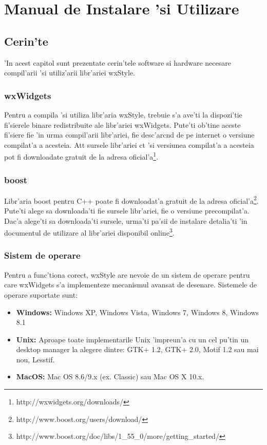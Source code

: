 \chapter{Manual de Instalare 'si Utilizare}
\pagestyle{headings}

\section{Cerin'te}

'In acest capitol sunt prezentate cerin'tele software si hardware necesare compil'arii 'si utiliz'arii libr'ariei wxStyle.

\subsection{wxWidgets}

Pentru a compila 'si utiliza libr'aria wxStyle, trebuie s'a ave'ti la dispozi'tie fi'sierele binare redistribuite ale libr'ariei wxWidgets. Pute'ti ob'tine aceste fi'siere fie 'in urma compil'arii libr'ariei, fie desc'arc{\ia}nd de pe internet o versiune compilat'a a acesteia. At{\ia}t sursele libr'ariei c{\ia}t 'si versiunea compilat'a a acesteia pot fi downloadate gratuit de la adresa oficial'a\footnote{http://wxwidgets.org/downloads/}.

\subsection{boost}

Libr'aria boost pentru C++ poate fi downloadat'a gratuit de la adresa oficial'a\footnote{http://www.boost.org/users/download/}. Pute'ti alege sa downloada'ti fie sursele libr'ariei, fie o versiune precompilat'a. Dac'a alege'ti sa downloada'ti sursele, urma'ti pa'sii de instalare detalia'ti 'in documentul de utilizare al libr'ariei disponibil online\footnote{http://www.boost.org/doc/libs/1\_55\_0/more/getting\_started/}.

\subsection{Sistem de operare}

Pentru a func'tiona corect, wxStyle are nevoie de un sistem de operare pentru care wxWidgets s'a implementeze mecanismul avansat de desenare. Sistemele de operare suportate sunt: 
\begin{itemize}
\item \textbf{Windows:} Windows XP, Windows Vista, Windows 7, Windows 8, Windows 8.1 
\item \textbf{Unix:} Aproape toate implementarile Unix 'impreun'a cu un cel pu'tin un desktop manager la alegere dintre: GTK+ 1.2, GTK+ 2.0, Motif 1.2 sau mai nou, Lesstif.
\item \textbf{MacOS:} Mac OS 8.6/9.x (ex. Classic) sau Mac OS X 10.x. 
\end{itemize}

